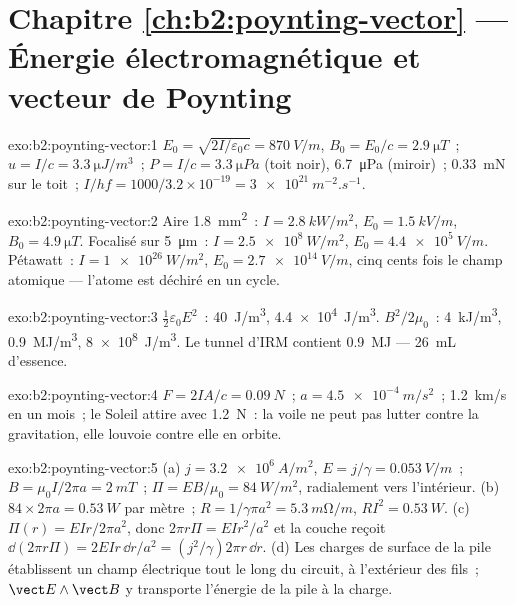 \section*{Chapitre \ref{ch:b2:poynting-vector} --- Énergie électromagnétique et vecteur de Poynting}

\begin{solution}{exo:b2:poynting-vector:1}
$E_0 = \sqrt{2I/\varepsilon_0c} = \qty{870}{V/m}$, $B_0 = E_0/c = \qty{2.9}{\micro T}$~; $u = I/c
= \qty{3.3}{\micro J/m^3}$~; $P = I/c = \qty{3.3}{\micro Pa}$ (toit noir), \qty{6.7}{\micro Pa}
(miroir)~; \qty{0.33}{mN} sur le toit~; $I/hf = 1000/3.2 \times 10^{-19} = \qty{3e21}{m^{-2}.s^{-1}}$.
\end{solution}

\begin{solution}{exo:b2:poynting-vector:2}
Aire \qty{1.8}{mm^2}~: $I = \qty{2.8}{kW/m^2}$, $E_0 = \qty{1.5}{kV/m}$, $B_0 = \qty{4.9}{\micro T}$.
Focalisé sur \qty{5}{\micro m}~: $I = \qty{2.5e8}{W/m^2}$, $E_0 = \qty{4.4e5}{V/m}$. Pétawatt~:
$I = \qty{1e26}{W/m^2}$, $E_0 = \qty{2.7e14}{V/m}$, cinq cents fois le champ
atomique --- l'atome est déchiré en un cycle.
\end{solution}

\begin{solution}{exo:b2:poynting-vector:3}
$\tfrac12\varepsilon_0E^2$~: \qty{40}{J/m^3}, \qty{4.4e4}{J/m^3}. $B^2/2\mu_0$~: \qty{4}{kJ/m^3},
\qty{0.9}{MJ/m^3}, \qty{8e8}{J/m^3}. Le tunnel d'IRM contient \qty{0.9}{MJ} --- \qty{26}{mL}
d'essence.
\end{solution}

\begin{solution}{exo:b2:poynting-vector:4}
$F = 2IA/c = \qty{0.09}{N}$~; $a = \qty{4.5e-4}{m/s^2}$~; \qty{1.2}{km/s} en un mois~;
le Soleil attire avec \qty{1.2}{N}~: la voile ne peut pas lutter contre la gravitation, elle
louvoie contre elle en orbite.
\end{solution}

\begin{solution}{exo:b2:poynting-vector:5}
(a) $j = \qty{3.2e6}{A/m^2}$, $E = j/\gamma = \qty{0.053}{V/m}$~; $B = \mu_0I/2\pi a = \qty{2}{mT}$~;
$\Pi = EB/\mu_0 = \qty{84}{W/m^2}$, radialement vers l'intérieur. (b) $84 \times 2\pi a = \qty{0.53}{W}$
par mètre~; $R = 1/\gamma\pi a^2 = \qty{5.3}{m\ohm/m}$, $RI^2 = \qty{0.53}{W}$. (c) $\Pi(r)
= EIr/2\pi a^2$, donc $2\pi r\Pi = EIr^2/a^2$ et la couche reçoit $\dd(2\pi r\Pi)
= 2EIr\,\dd r/a^2 = (j^2/\gamma)2\pi r\,\dd r$. (d) Les charges de surface de la pile
établissent un champ électrique tout le long du circuit, à l'extérieur des fils~;
$\vect E\wedge\vect B$ y transporte l'énergie de la pile à la charge.
\end{solution}


